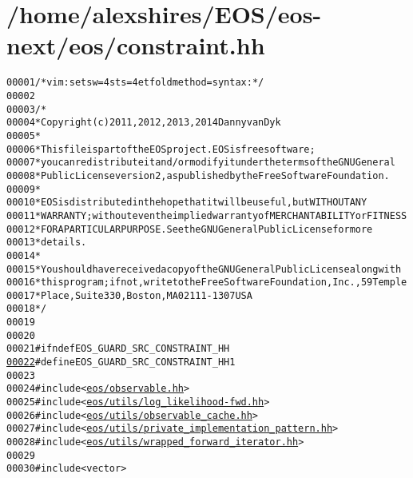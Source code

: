 \hypertarget{constraint_8hh_source}{
\section{/home/alexshires/EOS/eos-\/next/eos/constraint.hh}
}


\begin{footnotesize}\begin{alltt}
00001 \textcolor{comment}{/* vim: set sw=4 sts=4 et foldmethod=syntax : */}
00002 
00003 \textcolor{comment}{/*}
00004 \textcolor{comment}{ * Copyright (c) 2011, 2012, 2013, 2014 Danny van Dyk}
00005 \textcolor{comment}{ *}
00006 \textcolor{comment}{ * This file is part of the EOS project. EOS is free software;}
00007 \textcolor{comment}{ * you can redistribute it and/or modify it under the terms of the GNU General}
00008 \textcolor{comment}{ * Public License version 2, as published by the Free Software Foundation.}
00009 \textcolor{comment}{ *}
00010 \textcolor{comment}{ * EOS is distributed in the hope that it will be useful, but WITHOUT ANY}
00011 \textcolor{comment}{ * WARRANTY; without even the implied warranty of MERCHANTABILITY or FITNESS}
00012 \textcolor{comment}{ * FOR A PARTICULAR PURPOSE.  See the GNU General Public License for more}
00013 \textcolor{comment}{ * details.}
00014 \textcolor{comment}{ *}
00015 \textcolor{comment}{ * You should have received a copy of the GNU General Public License along with}
00016 \textcolor{comment}{ * this program; if not, write to the Free Software Foundation, Inc., 59 Temple}
00017 \textcolor{comment}{ * Place, Suite 330, Boston, MA  02111-1307  USA}
00018 \textcolor{comment}{ */}
00019 
00020 
00021 \textcolor{preprocessor}{#ifndef EOS\_GUARD\_SRC\_CONSTRAINT\_HH}
\hypertarget{constraint_8hh_source_l00022}{}\hyperlink{constraint_8hh_abe90181b1247bb83226d75c9e683cb96}{00022} \textcolor{preprocessor}{}\textcolor{preprocessor}{#define EOS\_GUARD\_SRC\_CONSTRAINT\_HH 1}
00023 \textcolor{preprocessor}{}
00024 \textcolor{preprocessor}{#include <\hyperlink{observable_8hh}{eos/observable.hh}>}
00025 \textcolor{preprocessor}{#include <\hyperlink{log__likelihood-fwd_8hh}{eos/utils/log_likelihood-fwd.hh}>}
00026 \textcolor{preprocessor}{#include <\hyperlink{observable__cache_8hh}{eos/utils/observable_cache.hh}>}
00027 \textcolor{preprocessor}{#include <\hyperlink{private__implementation__pattern_8hh}{eos/utils/private_implementation_pattern.hh}>}
00028 \textcolor{preprocessor}{#include <\hyperlink{wrapped__forward__iterator_8hh}{eos/utils/wrapped_forward_iterator.hh}>}
00029 
00030 \textcolor{preprocessor}{#include <vector>}

\end{alltt}
\end{footnotesize}
